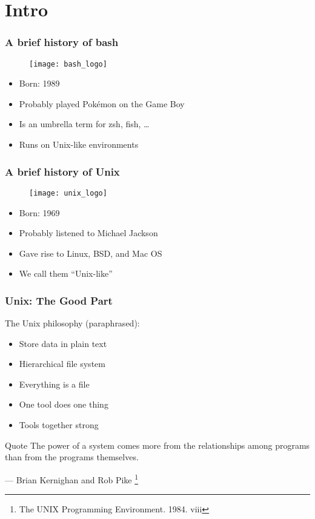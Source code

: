 \section{Intro}
\begin{frame}
\frametitle{A brief history of bash}
\begin{figure}[h]
    \centering
    \texttt{[image: bash\_logo]}
\end{figure}
\begin{itemize}
    \item Born: 1989
    \item Probably played Pokémon on the Game Boy
    \item Is an umbrella term for zsh, fish, …
    \item Runs on Unix-like environments
\end{itemize}
\end{frame}

\begin{frame}
\frametitle{A brief history of Unix}
\begin{figure}[h]
    \centering
    \texttt{[image: unix\_logo]}
\end{figure}
\begin{itemize}
    \item Born: 1969
    \item Probably listened to Michael Jackson
    \item Gave rise to Linux, BSD, and Mac OS
    \item We call them ``Unix-like''
\end{itemize}
\end{frame}

\begin{frame}
\frametitle{Unix: The Good Part}
The Unix philosophy (paraphrased):
\begin{itemize}
    \item Store data in plain text
    \item Hierarchical file system
    \item Everything is a file
    \item One tool does one thing
    \item Tools together strong
\end{itemize}
\begin{block}{Quote}
The power of a system comes more from the relationships among programs than
from the programs themselves.
\begin{flushright}
    — Brian Kernighan and Rob Pike
    \footnote{The UNIX Programming Environment. 1984. viii}
\end{flushright}
\end{block}
\end{frame}

